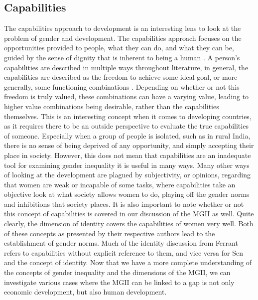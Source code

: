 \documentclass[12pt, letterpaper]{article}
\begin{document}
\subsection{Capabilities}
The capabilities approach to development is an interesting lens to look at the problem of gender and development. The capabilities approach focuses on the opportunities provided to people, what they can do, and what they can be, guided by the sense of dignity that is inherent to being a human \cite{nuss}. A person's capabilities are described in multiple ways throughout literature, in general, the capabilities are described as the freedom to achieve some ideal goal, or more generally, some functioning combinations \cite{sen}. Depending on whether or not this freedom is truly valued, these combinations can have a varying value, leading to higher value combinations being desirable, rather than the capabilities themselves. This is an interesting concept when it comes to developing countries, as it requires there to be an outside perspective to evaluate the true capabilities of someone. Especially when a group of people is isolated, such as in rural India, there is no sense of being deprived of any opportunity, and simply accepting their place in society. However, this does not mean that capabilities are an inadequate tool for examining gender inequality it is useful in many ways. Many other ways of looking at the development are plagued by subjectivity, or opinions, regarding that women are weak or incapable of some tasks, where capabilities take an objective look at what society allows women to do, playing off the gender norms and inhibitions that society places. It is also important to note whether or not this concept of capabilities is covered in our discussion of the MGII as well. Quite clearly, the dimension of identity covers the capabilities of women very well. Both of these concepts as presented by their respective authors lead to the establishment of gender norms. Much of the identity discussion from Ferrant refers to capabilities without explicit reference to them, and vice versa for Sen and the concept of identity. Now that we have a more complete understanding of the concepts of gender inequality and the dimensions of the MGII, we can investigate various cases where the MGII can be linked to a gap is not only economic development, but also human development. 
\end{document}
